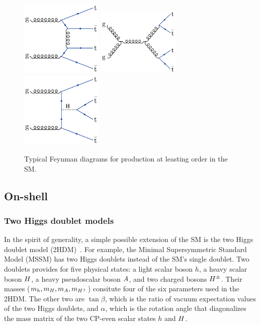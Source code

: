 \begin{figure}[!hbtp]
\centering
\includegraphics[width=0.35\textwidth]{figs/ftp/ftdiag1.pdf}
\includegraphics[width=0.35\textwidth]{figs/ftp/ftdiag2.pdf} \\
\includegraphics[width=0.35\textwidth]{figs/ftp/ftdiag3.pdf}
\caption{Typical Feynman diagrams for \tttt production at leasting order in the SM.}
\label{fig:ftdiags}
\end{figure}

\subsection{On-shell}

\subsubsection{Two Higgs doublet models}
\label{sec:ft2hdm}

In the spirit of generality, a simple possible extension of the SM 
is the two Higgs doublet model (2HDM)~\cite{THEORY:Branco2011iw}.
For example, the Minimal Supersymmetric Standard Model (MSSM)
has two Higgs doublets instead of the SM's single doublet.
Two doublets provides for five physical states: 
a light scalar boson $h$, a heavy scalar boson $H$, a heavy pseudoscalar boson $A$, and
two charged bosons $H^\pm$. Their masses ($m_h, m_H, m_A, m_{H^\pm}$)
consitute four of the six parameters used in the 2HDM. The other two are $\tan\beta$,
which is the ratio of vacuum expectation values of the two Higgs doublets,
and $\alpha$, which is the rotation angle that diagonalizes the mass matrix of the
two CP-even scalar states $h$ and $H$.

